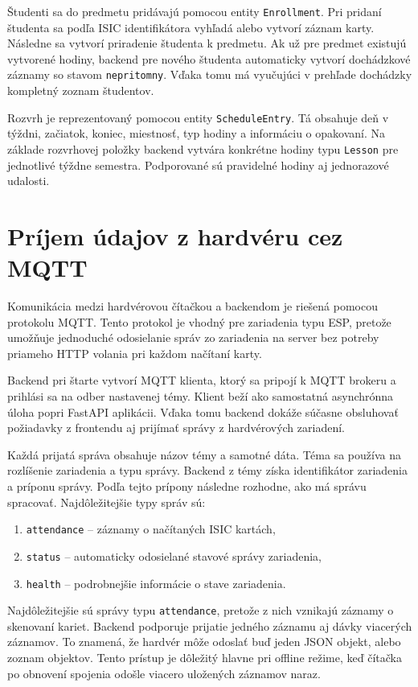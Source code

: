 Študenti sa do predmetu pridávajú pomocou entity \texttt{Enrollment}. Pri pridaní študenta sa podľa ISIC identifikátora vyhľadá alebo vytvorí záznam karty. Následne sa vytvorí priradenie študenta k predmetu. Ak už pre predmet existujú vytvorené hodiny, backend pre nového študenta automaticky vytvorí dochádzkové záznamy so stavom \texttt{nepritomny}. Vďaka tomu má vyučujúci v prehľade dochádzky kompletný zoznam študentov.

Rozvrh je reprezentovaný pomocou entity \texttt{ScheduleEntry}. Tá obsahuje deň v týždni, začiatok, koniec, miestnosť, typ hodiny a informáciu o opakovaní. Na základe rozvrhovej položky backend vytvára konkrétne hodiny typu \texttt{Lesson} pre jednotlivé týždne semestra. Podporované sú pravidelné hodiny aj jednorazové udalosti.

\section{Príjem údajov z hardvéru cez MQTT}
\label{sec:backend-mqtt}

Komunikácia medzi hardvérovou čítačkou a backendom je riešená pomocou protokolu MQTT. Tento protokol je vhodný pre zariadenia typu ESP, pretože umožňuje jednoduché odosielanie správ zo zariadenia na server bez potreby priameho HTTP volania pri každom načítaní karty.

Backend pri štarte vytvorí MQTT klienta, ktorý sa pripojí k MQTT brokeru a prihlási sa na odber nastavenej témy. Klient beží ako samostatná asynchrónna úloha popri FastAPI aplikácii. Vďaka tomu backend dokáže súčasne obsluhovať požiadavky z frontendu aj prijímať správy z hardvérových zariadení.

Každá prijatá správa obsahuje názov témy a samotné dáta. Téma sa používa na rozlíšenie zariadenia a typu správy. Backend z témy získa identifikátor zariadenia a príponu správy. Podľa tejto prípony následne rozhodne, ako má správu spracovať. Najdôležitejšie typy správ sú:
\begin{enumerate}
    \item \texttt{attendance} -- záznamy o načítaných ISIC kartách,
    \item \texttt{status} -- automaticky odosielané stavové správy zariadenia,
    \item \texttt{health} -- podrobnejšie informácie o stave zariadenia.
\end{enumerate}

Najdôležitejšie sú správy typu \texttt{attendance}, pretože z nich vznikajú záznamy o skenovaní kariet. Backend podporuje prijatie jedného záznamu aj dávky viacerých záznamov. To znamená, že hardvér môže odoslať buď jeden JSON objekt, alebo zoznam objektov. Tento prístup je dôležitý hlavne pri offline režime, keď čítačka po obnovení spojenia odošle viacero uložených záznamov naraz.

